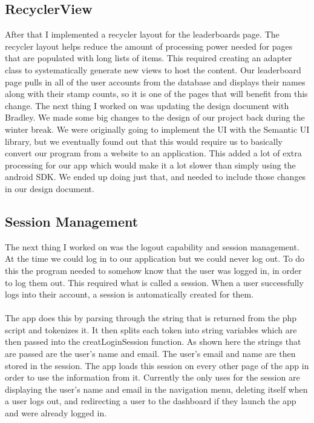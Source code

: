 \documentclass[draftclsnofoot, onecolumn, 10pt, compsoc]{IEEEtran}
\begin{document}
      \subsection{RecyclerView}
         After that I implemented a recycler layout for the leaderboards page. The recycler layout helps reduce the amount of processing power needed for pages that are populated with long lists of items. This required creating an adapter class to systematically generate new views to host the content. Our leaderboard page pulls in all of the user accounts from the database and displays their names along with their stamp counts, so it is one of the pages that will benefit from this change. The next thing I worked on was updating the design document with Bradley. We made some big changes to the design of our project back during the winter break. We were originally going to implement the UI with the Semantic UI library, but we eventually found out that this would require us to basically convert our program from a website to an application. This added a lot of extra processing for our app which would make it a lot slower than simply using the android SDK. We ended up doing just that, and needed to include those changes in our design document.

      \subsection{Session Management}
         The next thing I worked on was the logout capability and session management. At the time we could log in to our application but we could never log out. To do this the program needed to somehow know that the user was logged in, in order to log them out. This required what is called a session. When a user successfully logs into their account, a session is automatically created for them. \\ \\

         The app does this by parsing through the string that is returned from the php script and tokenizes it. It then splits each token into string variables which are then passed into the creatLoginSession function. As shown here the strings that are passed are the user’s name and email. The user’s email and name are then stored in the session. The app loads this session on every other page of the app in order to use the information from it. Currently the only uses for the session are displaying the user’s name and email in the navigation menu,  deleting itself when a user logs out, and redirecting a user to the dashboard if they launch the app and were already logged in. \\ \\
\end{document}

